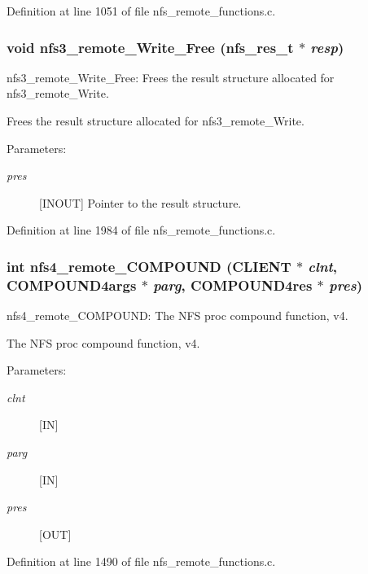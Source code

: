 Definition at line 1051 of file nfs\_\-remote\_\-functions.c.
\subsubsection{\setlength{\rightskip}{0pt plus 5cm}void nfs3\_\-remote\_\-Write\_\-Free (nfs\_\-res\_\-t $\ast$ {\em resp})}\label{group__NFSprocs_ga78}


nfs3\_\-remote\_\-Write\_\-Free: Frees the result structure allocated for nfs3\_\-remote\_\-Write.

Frees the result structure allocated for nfs3\_\-remote\_\-Write.

\begin{Desc}
\item[Parameters:]
\begin{description}
\item[{\em pres}][INOUT] Pointer to the result structure. \end{description}
\end{Desc}


Definition at line 1984 of file nfs\_\-remote\_\-functions.c.
\subsubsection{\setlength{\rightskip}{0pt plus 5cm}int nfs4\_\-remote\_\-COMPOUND (CLIENT $\ast$ {\em clnt}, COMPOUND4args $\ast$ {\em parg}, COMPOUND4res $\ast$ {\em pres})}\label{group__NFSprocs_ga40}


nfs4\_\-remote\_\-COMPOUND: The NFS proc compound function, v4.

The NFS proc compound function, v4.

\begin{Desc}
\item[Parameters:]
\begin{description}
\item[{\em clnt}][IN] \item[{\em parg}][IN] \item[{\em pres}][OUT] \end{description}
\end{Desc}


Definition at line 1490 of file nfs\_\-remote\_\-functions.c.
